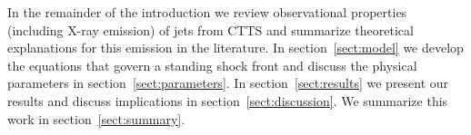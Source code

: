 In the remainder of the introduction we review observational properties (including X-ray emission) of jets from CTTS and summarize theoretical explanations for this emission in the literature. In section~\ref{sect:model} we develop the equations that govern a standing shock front and discuss the physical parameters in section~\ref{sect:parameters}. In section~\ref{sect:results} we present our results and discuss implications in section~\ref{sect:discussion}. We summarize this work in section~\ref{sect:summary}.